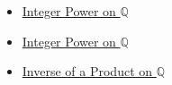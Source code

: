 \begin{dependencies}
\begin{itemize}
  \item \hyperref[def:integer-power-on-q]{Integer Power on $\mathbb{Q}$}
  \item \hyperref[def:integer-power-on-q]{Integer Power on $\mathbb{Q}$}
  \item \hyperref[cor:inverse-of-product-on-q]{Inverse of a Product on $\mathbb{Q}$}
\end{itemize}
\end{dependencies}
